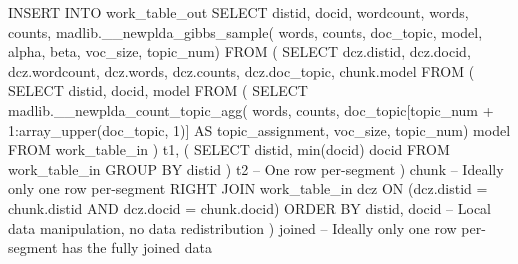 \begin{sql}[emph={work_table_out,work_table_in,__newplda_gibbs_sample,__newplda_count_topic_agg,model}]
    INSERT INTO work_table_out
    SELECT
        distid,
        docid,
        wordcount,
        words,
        counts,
        madlib.__newplda_gibbs_sample(
            words,
            counts,
            doc_topic,
            model,
            alpha,
            beta,
            voc_size,
            topic_num)
    FROM
    (
        SELECT
            dcz.distid,
            dcz.docid,
            dcz.wordcount,
            dcz.words,
            dcz.counts,
            dcz.doc_topic,
            chunk.model
        FROM
        (
            SELECT
                distid, docid, model
            FROM
            (
                SELECT
                    madlib.__newplda_count_topic_agg(
                        words,
                        counts,
                        doc_topic[topic_num + 1:array_upper(doc_topic, 1)]
                                AS topic_assignment,
                        voc_size,
                        topic_num) model
                FROM
                    work_table_in
            ) t1,
            (
                SELECT
                    distid,
                    min(docid) docid
                FROM
                    work_table_in
                GROUP BY distid
            ) t2 -- One row per-segment
        ) chunk -- Ideally only one row per-segment
        RIGHT JOIN work_table_in dcz
        ON (dcz.distid = chunk.distid AND dcz.docid = chunk.docid)
        ORDER BY distid, docid -- Local data manipulation, no data redistribution
    ) joined -- Ideally only one row per-segment has the fully joined data
\end{sql}
